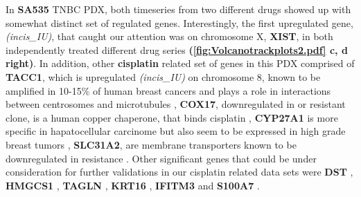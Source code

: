 In \textbf{SA535} TNBC PDX, both timeseries from two different drugs showed up with somewhat distinct set of regulated genes. Interestingly, the first upregulated gene,\textit{(incis\_IU)}, that caught our attention was on chromosome X, \textbf{XIST}\cite{salama2020xist,chen2017long, chen2019up}, in both independently treated different drug series \textbf{(\autoref{fig:Volcanotrackplots2.pdf} c, d right)}. 
In addition, other \textbf{cisplatin} related set of genes in this PDX comprised of \textbf{TACC1}, which is upregulated \textit{(incis\_IU)} on chromosome 8, known to be amplified in 10-15\% of human breast cancers and plays a role in interactions between centrosomes and microtubules \cite{ray2004genomic, gergely2000tacc, shakya2018high},
\textbf{COX17}, downregulated in or resistant clone, is a human copper chaperone, that binds cisplatin \cite{katano2002acquisition, zhao2014cisplatin}, \textbf{CYP27A1} is more specific in hapatocellular carcinome but also seem to be expressed in high grade breast tumors \cite{liang2019cyp27a1, wu201327}, \textbf{SLC31A2}, are membrane transporters known to be downregulated in resistance \cite{bai2017structural}. Other significant genes that could be under consideration for further validations in our cisplatin related data sets were \textbf{DST}  \cite{salerno2016human,lee2012differentially}, \textbf{HMGCS1} \cite{walsh2020mevalonate},
\textbf{TAGLN} \cite{wu2014transgelin, elsafadi2020transgelin},
\textbf{KRT16} \cite{huang2019novel},
\textbf{IFITM3} \cite{liu2019ifitm3} and
\textbf{S100A7} \cite{zhang2019clinical, mayama2018olfm}.


